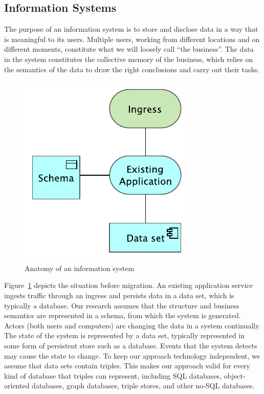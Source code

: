 \documentclass[runningheads]{llncs}
\newcommand{\ourtheory}{approach}
\begin{document}
\subsection{Information Systems}
   The purpose of an information system is to store and disclose data in a way that is meaningful to its users.
   Multiple users, working from different locations and on different moments, constitute what we will loosely call ``the business''.
   The data in the system constitutes the collective memory of the business,
   which relies on the semantics of the data to draw the right conclusions and carry out their tasks.
   \begin{figure}[bht]
      \begin{center}
        \includegraphics[scale=0.8]{figures/existing_system.pdf}
      \end{center}
   \caption{Anatomy of an information system}
   \label{fig:pre-migration}
   \end{figure}
   
   Figure~\ref{fig:pre-migration} depicts the situation before migration.
   An existing application service ingests traffic through an ingress and persists data in a data set, which is typically a database.
   Our research assumes that the structure and business semantics are represented in a schema, from which the system is generated.
   Actors (both users and computers) are changing the data in a system continually.
   The state of the system is represented by a data set, typically represented in some form of persistent store such as a database.
   Events that the system detects may cause the state to change.
   To keep our \ourtheory{} technology independent, we assume that data sets contain triples.
   This makes our \ourtheory{} valid for every kind of database that triples can represent,
   including SQL databases, object-oriented databases, graph databases, triple stores, and other no-SQL databases.
\end{document}
